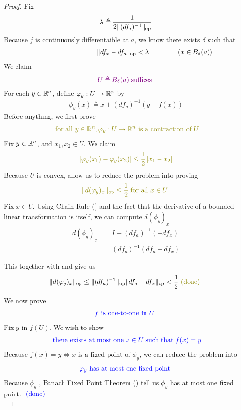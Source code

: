 \documentclass{report}
\begin{document}
\begin{proof}
Fix 
 \begin{align}
\label{ldteq}
\lambda   \triangleq  \frac{1}{2\| (df_a)^{-1} \|_\text{op}}
\end{align}
Because $f$ is continuously differentaible at  $a$, we know there exists  $\delta$ such that
\begin{align}
\label{fcond}
\hspace{3cm}\norm{df_x-df_a}_\text{op}< \ld  \hspace{1.5cm}(x\in B_\delta (a))
\end{align}
We claim 
\begin{align*}
  \textcolor{violet}{U\triangleq B_\delta(a)\text{ suffices }}
\end{align*}
For each $y\in\mathbb{R}^n$, define $\varphi_y:U\rightarrow \mathbb{R}^n$ by 
\begin{align*}
\phi_y(x)\triangleq x+ (df_a)^{-1}(y-f(x))
\end{align*}
Before anything, we first prove
\begin{align*}
  \olive{\text{ for all }y\inr^n, \phi_y:U\rightarrow \R^n\text{ is a contraction of $U$}}
\end{align*}
Fix $y \in\mathbb{R}^n$, and $x_1,x_2 \in U$. We claim 
\begin{align}
\label{phiy12}
\olive{\abso{\phi_y(x_1)-\phi_y (x_2)}\leq \frac{1}{2}\abso{x_1-x_2}}
\end{align}
Because $U$ is convex,  allow us to reduce the problem into proving 
\begin{align*}
\olive{\norm{d(\phi_y)_x}_\text{op}\leq \frac{1}{2}\text{ for all $x \in U$ }}
\end{align*}
Fix $x \in U$. Using Chain Rule () and the fact that the derivative of a bounded linear transformation is itself, we can compute $d(\phi_y)_x$ 
\begin{align*}
d(\phi_y)_x&=I+(df_a)^{-1}(-df_x)\\
&=(df_a)^{-1}(df_a-df_x)
\end{align*}

This together with  and  give us 
\begin{align*}
\norm{d(\phi_y)_x}_\text{op}\leq \norm{(df_a)^{-1}}_\text{op}\norm{df_a-df_x}_\text{op}<\frac{1}{2}\odone
\end{align*}

We now prove 
\begin{align*}
\textcolor{blue}{f\text{ is one-to-one in $U$ }}
\end{align*}
Fix $y$ in $f(U)$. We wish to show 
\begin{align*}
\textcolor{blue}{\text{ there exists at most one $x\in U$ such that }f(x)=y}
\end{align*}
Because $f(x)=y \iff x\text{ is a fixed point of }\phi_y$, we can reduce the problem into
\begin{align*}
  \textcolor{blue}{\varphi_y\text{ has at most one fixed point }}
\end{align*}
Because $\phi_y$ , Banach Fixed Point Theorem  () tell us $\phi_y$ has at most one fixed point. $\textcolor{blue}{\text{ (done) }}$\\  


\end{proof}
\end{document}
